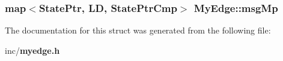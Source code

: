 \subsubsection{\setlength{\rightskip}{0pt plus 5cm}map$<${\bf StatePtr}, {\bf LD}, {\bf StatePtrCmp}$>$ {\bf MyEdge::msgMp}}\label{structMyEdge_2d2cab4963ddfcadd6cc05ab225b8ff2}




The documentation for this struct was generated from the following file:\begin{CompactItemize}
\item 
inc/{\bf myedge.h}\end{CompactItemize}
